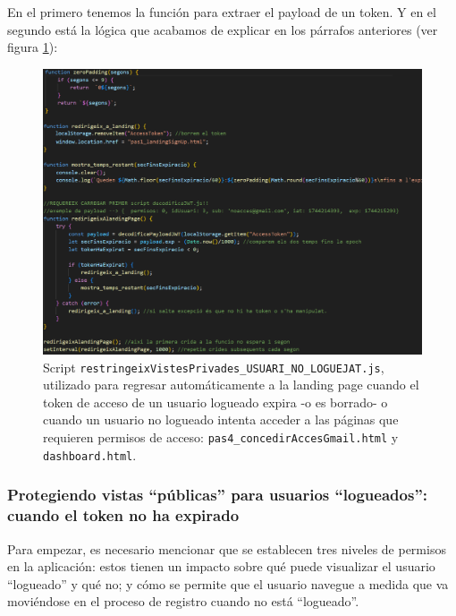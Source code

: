 \documentclass[a4paper,12pt]{report}
\begin{document}
	
	En el primero tenemos la función para extraer el payload de un token. Y en el segundo está la lógica que acabamos de explicar en los párrafos anteriores (ver figura \ref{fig:restringeixVistesPrivades_USUARI_NO_LOGUEJAT}):
	
	
	\setlength{\belowcaptionskip}{3pt}
	\FloatBarrier
	\begin{figure}[H]
		\centering
		\caption{Script \texttt{restringeixVistesPrivades\_USUARI\_NO\_LOGUEJAT.js}, utilizado para regresar automáticamente a la landing page cuando el token de acceso de un usuario logueado expira -o es borrado- o cuando un usuario no logueado intenta acceder a las páginas que requieren permisos de acceso: \texttt{pas4\_concedirAccesGmail.html} y \texttt{dashboard.html}.}
		\includegraphics[width=1\linewidth]{img/restringeixVistesPrivades_USUARI_NO_LOGUEJAT.png}

		\label{fig:restringeixVistesPrivades_USUARI_NO_LOGUEJAT}
	\end{figure}
	\FloatBarrier
	
	\subsubsection{Protegiendo vistas ``públicas'' para usuarios ``logueados'': cuando el token no ha expirado}
	\label{sec:vistasPermisos}
	

	
	Para empezar, es necesario mencionar que se establecen tres niveles de permisos en la aplicación: estos  tienen un impacto sobre qué puede visualizar el usuario ``logueado'' y qué no; y cómo se permite que el usuario navegue a medida que va moviéndose en el proceso de registro cuando no está ``logueado''.
	
\end{document}
